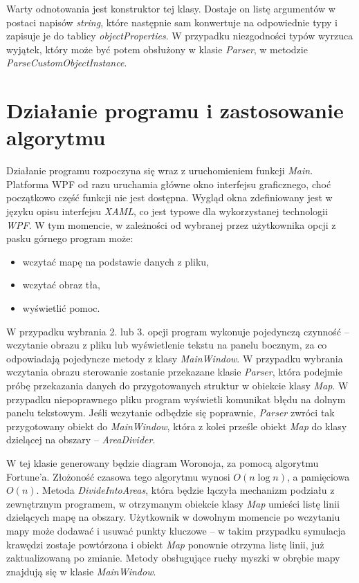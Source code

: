\documentclass[a4paper,11pt]{article}
\newcommand\tab[1][0.6cm]{\hspace*{#1}}
\begin{document}
Warty odnotowania jest konstruktor tej klasy. Dostaje on listę argumentów w postaci napisów \textit{string}, które następnie sam konwertuje na odpowiednie typy i zapisuje je do tablicy \textit{objectProperties}. W przypadku niezgodności typów wyrzuca wyjątek, który może być potem obsłużony w klasie \textit{Parser}, w metodzie \textit{ParseCustomObjectInstance}.

\newpage

\section{Działanie programu i zastosowanie algorytmu}

\tab Działanie programu rozpoczyna się wraz z uruchomieniem funkcji \textit{Main}. Platforma WPF od razu uruchamia główne okno interfejsu graficznego, choć początkowo część funkcji nie jest dostępna. Wygląd okna zdefiniowany jest w języku opisu interfejsu \textit{XAML}, co jest typowe dla wykorzystanej technologii \textit{WPF}. W tym momencie, w zależności od wybranej przez użytkownika opcji z pasku górnego program może:

\begin{itemize}
\item wczytać mapę na podstawie danych z pliku,
\item wczytać obraz tła,
\item wyświetlić pomoc.
\end{itemize}

W przypadku wybrania 2. lub 3. opcji program wykonuje pojedynczą czynność -- wczytanie obrazu z pliku lub wyświetlenie tekstu na panelu bocznym, za co odpowiadają pojedyncze metody z klasy \textit{MainWindow}. W przypadku wybrania wczytania obrazu sterowanie zostanie przekazane klasie \textit{Parser}, która podejmie próbę przekazania danych do przygotowanych struktur w obiekcie klasy \textit{Map}. W przypadku niepoprawnego pliku program wyświetli komunikat błędu na dolnym panelu tekstowym. Jeśli wczytanie odbędzie się poprawnie, \textit{Parser} zwróci tak przygotowany obiekt do \textit{MainWindow}, która z kolei prześle obiekt \textit{Map} do klasy dzielącej na obszary -- \textit{AreaDivider}.

W tej klasie generowany będzie diagram Woronoja, za pomocą algorytmu Fortune'a. Złożoność czasowa tego algorytmu wynosi \textit{$O(n\log{}n)$}, a pamięciowa \textit{$O(n)$}. Metoda \textit{DivideIntoAreas}, która będzie łączyła mechanizm podziału z zewnętrznym programem, w otrzymanym obiekcie klasy \textit{Map} umieści listę linii dzielących mapę na obszary. Użytkownik w dowolnym momencie po wczytaniu mapy może dodawać i usuwać punkty kluczowe -- w takim przypadku symulacja krawędzi zostaje powtórzona i obiekt \textit{Map} ponownie otrzyma listę linii, już zaktualizowaną po zmianie. Metody obsługujące ruchy myszki w obrębie mapy znajdują się w klasie \textit{MainWindow}.
\end{document}
